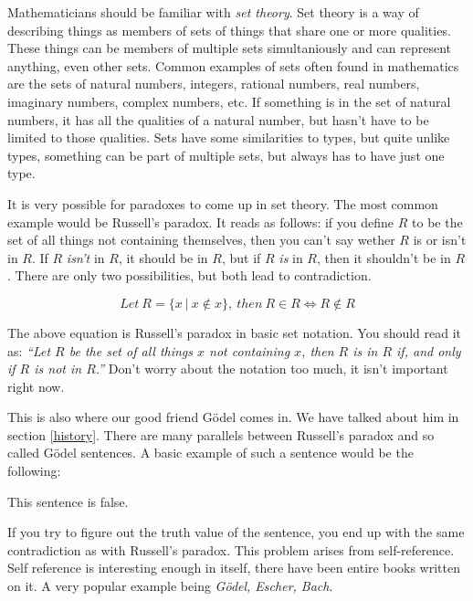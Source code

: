 \documentclass[11pt]{article}
\begin{document}
Mathematicians should be familiar with \emph{set theory}. Set theory is a way
of describing things as members of sets of things that share one or more
qualities. These things can be members of multiple sets simultaniously and can
represent anything, even other sets. Common examples of sets often found in
mathematics are the sets of natural numbers, integers, rational numbers, real
numbers, imaginary numbers, complex numbers, etc. If something is in the set of
natural numbers, it has all the qualities of a natural number, but hasn't have
to be limited to those qualities. Sets have some similarities to types, but
quite unlike types, something can be part of multiple sets, but always has to
have just one type.

It is very possible for paradoxes to come up in set theory. The most common
example would be Russell's paradox. It reads as follows: if you define \(R\) to
be the set of all things not containing themselves, then you can't say wether
\(R\) is or isn't in \(R\). If \(R\) \emph{isn't} in \(R\), it should be in
\(R\), but if \(R\) \emph{is} in \(R\), then it shouldn't be in \(R\). There
are only two possibilities, but both lead to contradiction.


\[Let\ R = \{x\ |\ x \notin x \},\ then\ R \in R \iff R \notin R\]

The above equation is Russell's paradox in basic set notation. You should read
it as: \emph{``Let \(R\) be the set of all things \(x\) not containing \(x\),
then \(R\) is in \(R\) if, and only if \(R\) is not in \(R\).''} Don't worry
about the notation too much, it isn't important right now.

This is also where our good friend Gödel comes in. We have talked about him in
section \ref{history}. There are many parallels between Russell's paradox and
so called Gödel sentences. A basic example of such a sentence would be the
following:

\begin{center}
This sentence is false.
\end{center}

If you try to figure out the truth value of the sentence, you end up with the
same contradiction as with Russell's paradox. This problem arises from
self-reference. Self reference is interesting enough in itself, there have been
entire books written on it. A very popular example being \emph{Gödel, Escher,
Bach}.

\end{document}
